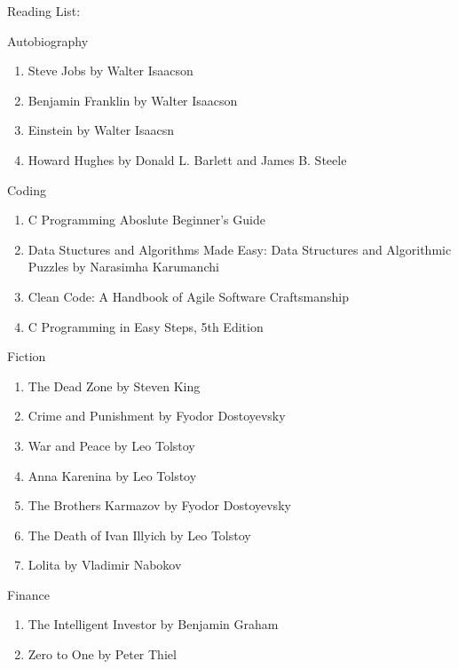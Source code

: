 \documentclass{article}
\begin{document}
\Huge Reading List: 

\hrulefill

\LARGE Autobiography

\normalsize 
    \begin{enumerate}
        \item Steve Jobs by Walter Isaacson
        \item Benjamin Franklin by Walter Isaacson
        \item Einstein by Walter Isaacsn 
        \item Howard Hughes by Donald L. Barlett and James B. Steele
    \end{enumerate}

\hrulefill

\LARGE Coding

\normalsize 
    \begin{enumerate}
        \item C Programming Aboslute Beginner's Guide
        \item Data Stuctures and Algorithms Made Easy: Data Structures and Algorithmic Puzzles by Narasimha Karumanchi
        \item Clean Code: A Handbook of Agile Software Craftsmanship 
        \item C Programming in Easy Steps, 5th Edition 
    \end{enumerate}

\hrulefill

\LARGE Fiction

\normalsize
    \begin{enumerate}
        \item The Dead Zone by Steven King
        \item Crime and Punishment by Fyodor Dostoyevsky
        \item War and Peace by Leo Tolstoy
        \item Anna Karenina by Leo Tolstoy
        \item The Brothers Karmazov by Fyodor Dostoyevsky
        \item The Death of Ivan Illyich by Leo Tolstoy
        \item Lolita by Vladimir Nabokov 
    \end{enumerate}

\hrulefill

\LARGE Finance

\normalsize
    \begin{enumerate}
        \item The Intelligent Investor by Benjamin Graham
        \item Zero to One by Peter Thiel
    \end{enumerate}
\end{document}
